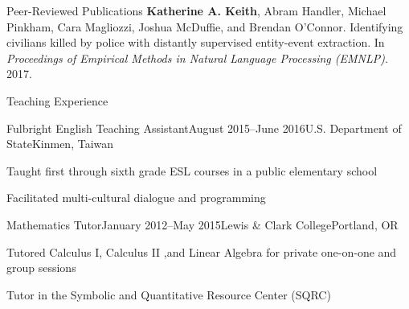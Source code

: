 \documentclass{resume} %
\begin{document}
%
\begin{rSection}{Peer-Reviewed Publications}
\textbf{Katherine A. Keith}, Abram Handler, Michael Pinkham, Cara Magliozzi, Joshua McDuffie, and Brendan O'Connor. Identifying civilians killed by police with distantly supervised entity-event extraction. In \emph{Proceedings of Empirical Methods in Natural Language Processing (EMNLP)}. 2017. 

\end{rSection}


\begin{rSection}{Teaching Experience}

\begin{rSubsection}{Fulbright English Teaching Assistant}{August 2015--June 2016}{U.S. Department of State}{Kinmen, Taiwan}
\item Taught first through sixth grade ESL courses in a public elementary school
\item Facilitated multi-cultural dialogue and programming
\end{rSubsection}

\begin{rSubsection}{Mathematics Tutor}{January 2012--May 2015}{Lewis \& Clark College}{Portland, OR}
\item Tutored Calculus I, Calculus II ,and Linear Algebra for private one-on-one and group sessions
\item Tutor in the Symbolic and Quantitative Resource Center (SQRC) 
\end{rSubsection}

\end{rSection}

\end{document}
